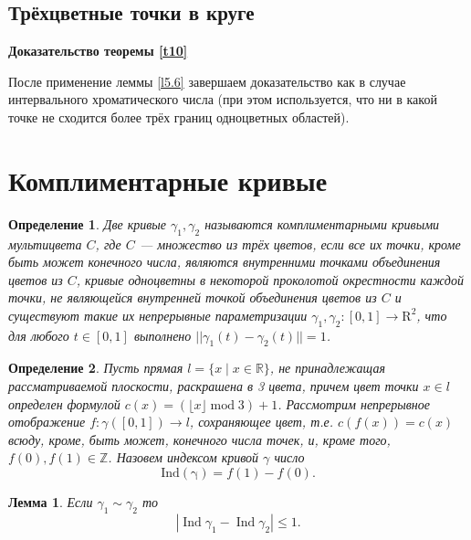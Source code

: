 \documentclass[12pt,a4paper]{article}
\newtheorem{mydef}{Определение}
\newtheorem{lemma}{Лемма}
\begin{document}
\subsection{Трёхцветные точки в круге}

\textbf{Доказательство теоремы \ref{t10}}

После применение леммы \ref{l5.6} завершаем доказательство как в случае интервального хроматического числа (при этом используется, что ни в какой точке не сходится более трёх границ одноцветных областей).

\section{Комплиментарные кривые}

\begin{mydef}
	Две кривые $\gamma_1, \gamma_2$ называются комплиментарными кривыми мультицвета $C$, где $C$ --- множество из трёх цветов, если все их точки, кроме быть может конечного числа, являются внутренними точками объединения цветов из $C$, кривые одноцветны в некоторой проколотой окрестности каждой точки, не являющейся внутренней точкой объединения цветов из $C$ и существуют такие их непрерывные параметризации $\gamma_1, \gamma_2: [0, 1] \rightarrow \mathrm{R}^2$, что для любого $t \in [0, 1]$ выполнено $||\gamma_1(t) - \gamma_2(t)|| = 1$. 
\end{mydef}


\begin{mydef}
    Пусть  прямая $l =\{x \mid x \in\mathbb{R}\}$, не принадлежащая рассматриваемой плоскости, раскрашена в 3 цвета, причем цвет точки $x\in l$ определен формулой $c(x) = (\lfloor x \rfloor \operatorname{mod} 3) +1$. Рассмотрим непрерывное отображение $f: \gamma([0,1]) \to l$, сохраняющее цвет, т.е. $c(f(x))=c(x)$ всюду, кроме, быть может, конечного числа точек, и, кроме того, $f(0), f(1) \in \mathbb{Z}$. Назовем индексом кривой $\gamma$ число 
    \[\operatorname{Ind(\gamma)}=f(1)-f(0).\]
\end{mydef}


\begin{lemma}
    Если  $\gamma_1 \sim \gamma_2$ то 
    \[
        |\operatorname{Ind} \gamma_1 - \operatorname{Ind} \gamma_2|\leq 1.
    \]
\end{lemma}
\end{document}
